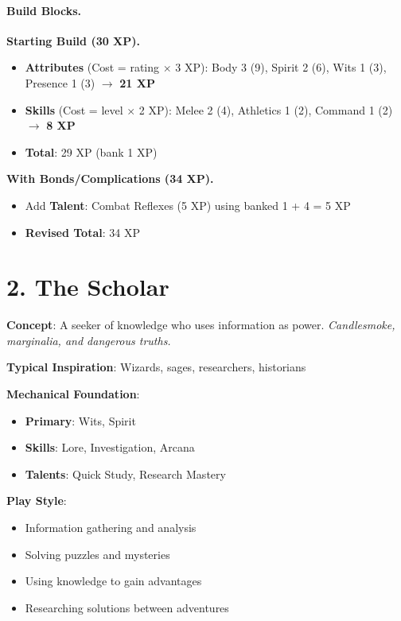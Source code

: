 \paragraph{Build Blocks.}
\textbf{Starting Build (30 XP).}
\begin{itemize}
\item \textbf{Attributes} (Cost = rating $\times$ 3 XP): Body 3 (9), Spirit 2 (6), Wits 1 (3), Presence 1 (3) $\rightarrow$ \textbf{21 XP}
\item \textbf{Skills} (Cost = level $\times$ 2 XP): Melee 2 (4), Athletics 1 (2), Command 1 (2) $\rightarrow$ \textbf{8 XP}
\item \textbf{Total}: 29 XP (bank 1 XP)
\end{itemize}
\textbf{With Bonds/Complications (34 XP).}
\begin{itemize}
\item Add \textbf{Talent}: Combat Reflexes (5 XP) using banked 1 + 4 = 5 XP
\item \textbf{Revised Total}: 34 XP
\end{itemize}

\section{2. The Scholar}

\textbf{Concept}: A seeker of knowledge who uses information as power. \emph{Candlesmoke, marginalia, and dangerous truths.}

\textbf{Typical Inspiration}: Wizards, sages, researchers, historians

\textbf{Mechanical Foundation}:
\begin{itemize}
\item \textbf{Primary}: Wits, Spirit
\item \textbf{Skills}: Lore, Investigation, Arcana
\item \textbf{Talents}: Quick Study, Research Mastery
\end{itemize}

\textbf{Play Style}:
\begin{itemize}
\item Information gathering and analysis
\item Solving puzzles and mysteries
\item Using knowledge to gain advantages
\item Researching solutions between adventures
\end{itemize}

